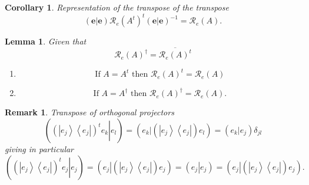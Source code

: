 \documentclass[aps,preprint]{revtex4}%
\newtheorem{corollary}[theorem]{Corollary}
\newtheorem{lemma}[theorem]{Lemma}
\newtheorem{remark}[theorem]{Remark}
\begin{document}
\begin{corollary}
Representation of the transpose of the transpose%
\begin{equation}
\left(  \left.  \mathbf{e}\right\vert \mathbf{e}\right)  \mathcal{R}%
_{e}\left(  A^{t}\right)  ^{t}\left(  \left.  \mathbf{e}\right\vert
\mathbf{e}\right)  ^{-1}=\mathcal{R}_{e}\left(  A\right)  .
\end{equation}

\end{corollary}

\begin{lemma}
Given that
\begin{equation}
\mathcal{R}_{e}\left(  A\right)  ^{\dagger}=\overline{\mathcal{R}_{e}\left(
A\right)  ^{t}}%
\end{equation}


\begin{enumerate}
\item
\begin{equation}
\text{If }A=A^{t}\text{ then }\mathcal{R}_{e}\left(  A\right)  ^{t}%
=\mathcal{R}_{e}\left(  A\right)
\end{equation}


\item
\begin{equation}
\text{If }A=A^{\dagger}\text{ then }\mathcal{R}_{e}\left(  A\right)
^{\dagger}=\mathcal{R}_{e}\left(  A\right)  .
\end{equation}

\end{enumerate}
\end{lemma}

\begin{remark}
Transpose of orthogonal projectors
\begin{equation}
\left(  \left.  \overset{}{\left(  \left\vert e_{j}\right\rangle \left\langle
e_{j}\right\vert \right)  ^{t}e_{k}}\right\vert e_{l}\right)  =\left(  \left.
\overset{}{e_{k}}\right\vert \left(  \overset{}{\left\vert e_{j}\right\rangle
\left\langle e_{j}\right\vert }\right)  e_{l}\right)  =\left(  \left.
\overset{}{e_{k}}\right\vert e_{j}\right)  \delta_{jl}%
\end{equation}
giving in particular%
\begin{equation}
\left(  \left.  \left(  \overset{}{\left\vert e_{j}\right\rangle \left\langle
e_{j}\right\vert }\right)  ^{t}e_{j}\right\vert e_{j}\right)  =\left(  \left.
\overset{}{e_{j}}\right\vert \left(  \overset{}{\left\vert e_{j}\right\rangle
\left\langle e_{j}\right\vert }\right)  e_{j}\right)  =\left(  \left.
\overset{}{e_{j}}\right\vert e_{j}\right)  =\left(  \left.
\overset{\overset{}{}}{e_{j}}\right\vert \left(  \overset{}{\left\vert
e_{j}\right\rangle \left\langle e_{j}\right\vert }\right)  e_{j}\right)  .
\end{equation}

\end{remark}
\end{document}
